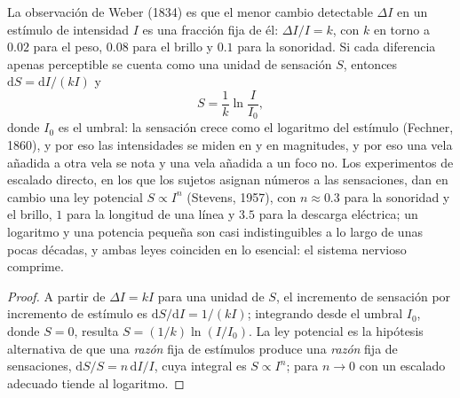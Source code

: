 \begin{theorem}\label{thm:b3:sensory-systems:weber}
La observación de Weber (1834) es que el menor cambio detectable
$\Delta I$ en un estímulo de intensidad $I$ es una fracción fija de él:
$\Delta I/I = k$, con $k$ en torno a $0.02$ para el peso, $0.08$ para
el brillo y $0.1$ para la sonoridad. Si cada diferencia apenas
perceptible se cuenta como una unidad de sensación $S$, entonces $\mathrm{d}S = \mathrm{d}I/
(kI)$ y
\[
S = \frac{1}{k}\ln\frac{I}{I_{0}} ,
\]
donde $I_{0}$ es el umbral: la sensación crece como el logaritmo del
estímulo (Fechner, 1860), y por eso las intensidades se miden en
 y en magnitudes, y por eso una vela añadida a otra vela se
nota y una vela añadida a un foco no. Los experimentos de escalado
directo, en los que los sujetos asignan números a las sensaciones, dan
en cambio una ley potencial $S \propto I^{n}$ (Stevens, 1957), con $n \approx
0.3$ para la sonoridad y el brillo, $1$ para la longitud de una línea y
$3.5$ para la descarga eléctrica; un logaritmo y una potencia pequeña
son casi indistinguibles a lo largo de unas pocas décadas, y ambas
leyes coinciden en lo esencial: el sistema nervioso comprime.
\end{theorem}
\begin{proof}
A partir de $\Delta I = kI$ para una unidad de $S$, el incremento de
sensación por incremento de estímulo es $\mathrm{d}S/\mathrm{d}I = 1/(kI)$;
integrando desde el umbral $I_{0}$, donde $S = 0$, resulta $S = (1/k)
\ln(I/I_{0})$. La ley potencial es la hipótesis alternativa de que una
\emph{razón} fija de estímulos produce una \emph{razón} fija de
sensaciones, $\mathrm{d}S/S = n\,\mathrm{d}I/I$, cuya integral es $S \propto I^{n}$;
para $n \to 0$ con un escalado adecuado tiende al logaritmo.
\end{proof}

